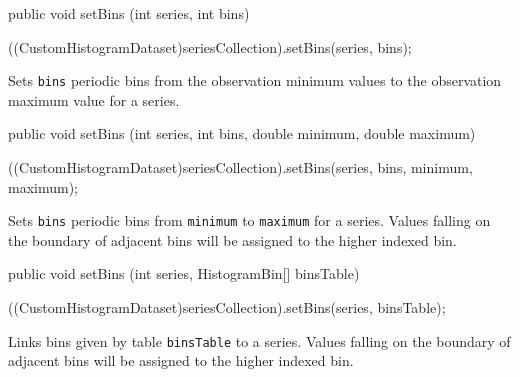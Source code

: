 \begin{code}

   public void setBins (int series, int bins) \begin{hide} {
      ((CustomHistogramDataset)seriesCollection).setBins(series, bins);
   }\end{hide}
\end{code}
\begin{tabb}
   Sets \texttt{bins} periodic bins from the observation minimum values to the observation maximum value for a series.
\end{tabb}
\begin{htmlonly}
\end{htmlonly}
\begin{code}

   public void setBins (int series, int bins, double minimum, double maximum) \begin{hide} {
      ((CustomHistogramDataset)seriesCollection).setBins(series, bins, minimum, maximum);
   }\end{hide}
\end{code}
\begin{tabb}
   Sets \texttt{bins} periodic bins from \texttt{minimum} to \texttt{maximum} for a series.
   Values falling on the boundary of adjacent bins will be assigned to the higher indexed bin.
\end{tabb}
\begin{htmlonly}
\end{htmlonly}
\begin{code}

   public void setBins (int series, HistogramBin[] binsTable) \begin{hide} {
      ((CustomHistogramDataset)seriesCollection).setBins(series, binsTable);
   }\end{hide}
\end{code}
\begin{tabb}
   Links bins given by table \texttt{binsTable} to a series.
   Values falling on the boundary of adjacent bins will be assigned to the higher indexed bin.
\end{tabb}
